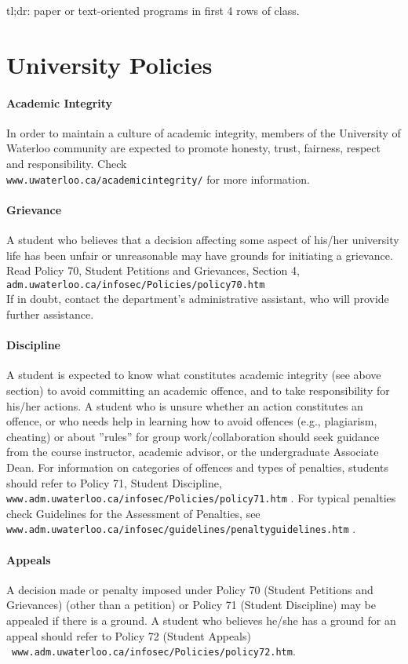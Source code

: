 \documentclass[letterpaper,10pt]{article}
\begin{document}
tl;dr: paper or text-oriented programs in first 4 rows of class.

\section*{University Policies}

\paragraph{Academic Integrity}
In order to maintain a culture of academic integrity, members of the University of Waterloo community are expected to promote honesty, trust, fairness, respect and responsibility. Check\\
\texttt{www.uwaterloo.ca/academicintegrity/} for more information.

\paragraph{Grievance}
A student who believes that a decision affecting some aspect of his/her university life has been unfair or unreasonable may have grounds for initiating a grievance. Read Policy 70, Student Petitions and Grievances, Section 4, \texttt{adm.uwaterloo.ca/infosec/Policies/policy70.htm} \\
If in doubt, contact the department's administrative assistant, who will provide further assistance.

\paragraph{Discipline}
A student is expected to know what constitutes academic integrity (see above section) to avoid committing an academic offence, and to take responsibility for his/her actions. A student who is unsure whether an action constitutes an offence, or who needs help in learning how to avoid offences (e.g., plagiarism, cheating) or about ''rules'' for group work/collaboration should seek guidance from the course instructor, academic advisor, or the undergraduate Associate Dean. For information on categories of offences and types of penalties, students should refer to Policy 71, Student Discipline, \texttt{www.adm.uwaterloo.ca/infosec/Policies/policy71.htm} . For typical penalties check Guidelines for the Assessment of Penalties, see \\\texttt{www.adm.uwaterloo.ca/infosec/guidelines/penaltyguidelines.htm} .

\paragraph{Appeals}
A decision made or penalty imposed under Policy 70 (Student Petitions and Grievances) (other than a petition) or Policy 71 (Student Discipline) may be appealed if there is a ground. A student who believes he/she has a ground for an appeal should refer to Policy 72 (Student Appeals)\\~\texttt{www.adm.uwaterloo.ca/infosec/Policies/policy72.htm}.
\end{document}
